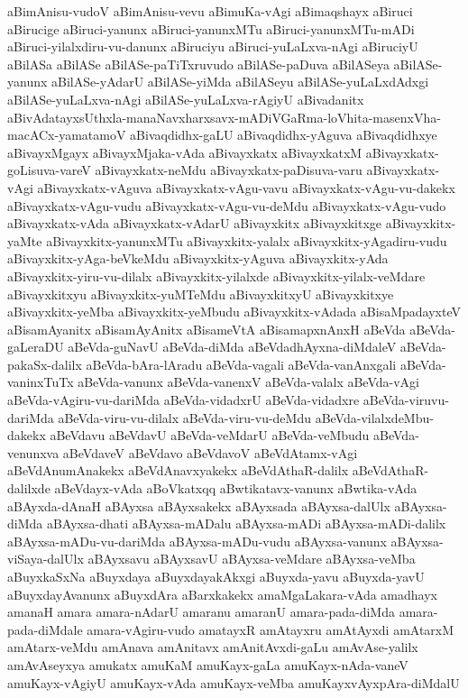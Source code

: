 {aBimAnisu-vudoV
aBimAnisu-vevu
aBimuKa-vAgi
aBimaqshayx
aBiruci
aBirucige
aBiruci-yanunx
aBiruci-yanunxMTu
aBiruci-yanunxMTu-mADi
aBiruci-yilalxdiru-vu-danunx
aBiruciyu
aBiruci-yuLaLxva-nAgi
aBiruciyU
aBilASa
aBilASe
aBilASe-paTiTxruvudo
aBilASe-paDuva
aBilASeya
aBilASe-yanunx
aBilASe-yAdarU
aBilASe-yiMda
aBilASeyu
aBilASe-yuLaLxdAdxgi
aBilASe-yuLaLxva-nAgi
aBilASe-yuLaLxva-rAgiyU
aBivadanitx
aBivAdatayxsUthxla-manaNavxharxsavx-mADiVGaRma-loVhita-masenxVha-macACx-yamatamoV
aBivaqdidhx-gaLU
aBivaqdidhx-yAguva
aBivaqdidhxye
aBivayxMgayx
aBivayxMjaka-vAda
aBivayxkatx
aBivayxkatxM
aBivayxkatx-goLisuva-vareV
aBivayxkatx-neMdu
aBivayxkatx-paDisuva-varu
aBivayxkatx-vAgi
aBivayxkatx-vAguva
aBivayxkatx-vAgu-vavu
aBivayxkatx-vAgu-vu-dakekx
aBivayxkatx-vAgu-vudu
aBivayxkatx-vAgu-vu-deMdu
aBivayxkatx-vAgu-vudo
aBivayxkatx-vAda
aBivayxkatx-vAdarU
aBivayxkitx
aBivayxkitxge
aBivayxkitx-yaMte
aBivayxkitx-yanunxMTu
aBivayxkitx-yalalx
aBivayxkitx-yAgadiru-vudu
aBivayxkitx-yAga-beVkeMdu
aBivayxkitx-yAguva
aBivayxkitx-yAda
aBivayxkitx-yiru-vu-dilalx
aBivayxkitx-yilalxde
aBivayxkitx-yilalx-veMdare
aBivayxkitxyu
aBivayxkitx-yuMTeMdu
aBivayxkitxyU
aBivayxkitxye
aBivayxkitx-yeMba
aBivayxkitx-yeMbudu
aBivayxkitx-vAdada
aBisaMpadayxteV
aBisamAyanitx
aBisamAyAnitx
aBisameVtA
aBisamapxnAnxH
aBeVda
aBeVda-gaLeraDU
aBeVda-guNavU
aBeVda-diMda
aBeVdadhAyxna-diMdaleV
aBeVda-pakaSx-dalilx
aBeVda-bAra-lAradu
aBeVda-vagali
aBeVda-vanAnxgali
aBeVda-vaninxTuTx
aBeVda-vanunx
aBeVda-vanenxV
aBeVda-valalx
aBeVda-vAgi
aBeVda-vAgiru-vu-dariMda
aBeVda-vidadxrU
aBeVda-vidadxre
aBeVda-viruvu-dariMda
aBeVda-viru-vu-dilalx
aBeVda-viru-vu-deMdu
aBeVda-vilalxdeMbu-dakekx
aBeVdavu
aBeVdavU
aBeVda-veMdarU
aBeVda-veMbudu
aBeVda-venunxva
aBeVdaveV
aBeVdavo
aBeVdavoV
aBeVdAtamx-vAgi
aBeVdAnumAnakekx
aBeVdAnavxyakekx
aBeVdAthaR-dalilx
aBeVdAthaR-dalilxde
aBeVdayx-vAda
aBoVkatxqq
aBwtikatavx-vanunx
aBwtika-vAda
aBAyxda-dAnaH
aBAyxsa
aBAyxsakekx
aBAyxsada
aBAyxsa-dalUlx
aBAyxsa-diMda
aBAyxsa-dhati
aBAyxsa-mADalu
aBAyxsa-mADi
aBAyxsa-mADi-dalilx
aBAyxsa-mADu-vu-dariMda
aBAyxsa-mADu-vudu
aBAyxsa-vanunx
aBAyxsa-viSaya-dalUlx
aBAyxsavu
aBAyxsavU
aBAyxsa-veMdare
aBAyxsa-veMba
aBuyxkaSxNa
aBuyxdaya
aBuyxdayakAkxgi
aBuyxda-yavu
aBuyxda-yavU
aBuyxdayAvanunx
aBuyxdAra
aBarxkakekx
amaMgaLakara-vAda
amadhayx
amanaH
amara
amara-nAdarU
amaranu
amaranU
amara-pada-diMda
amara-pada-diMdale
amara-vAgiru-vudo
amatayxR
amAtayxru
amAtAyxdi
amAtarxM
amAtarx-veMdu
amAnava
amAnitavx
amAnitAvxdi-gaLu
amAvAse-yalilx
amAvAseyxya
amukatx
amuKaM
amuKayx-gaLa
amuKayx-nAda-vaneV
amuKayx-vAgiyU
amuKayx-vAda
amuKayx-veMba
amuKayxvAyxpAra-diMdalU
}
